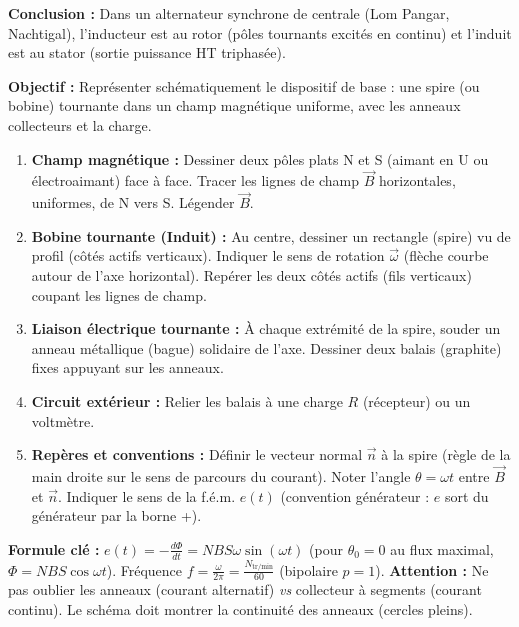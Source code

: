 \documentclass[11pt]{article}
\begin{document}
\begin{exoresolu}
\begin{enumerate}
\end{enumerate}
\par\medskip\noindent\textbf{Conclusion :} Dans un alternateur synchrone de centrale (Lom Pangar, Nachtigal), l'inducteur est au rotor (pôles tournants excités en continu) et l'induit est au stator (sortie puissance HT triphasée).
\end{exoresolu}

\begin{methode}
    \textbf{Objectif :} Représenter schématiquement le dispositif de base : une spire (ou bobine) tournante dans un champ magnétique uniforme, avec les anneaux collecteurs et la charge.
    \begin{enumerate}
        \item \textbf{Champ magnétique :} Dessiner deux pôles plats N et S (aimant en U ou électroaimant) face à face. Tracer les lignes de champ $\vec{B}$ horizontales, uniformes, de N vers S. Légender $\vec{B}$.
        \item \textbf{Bobine tournante (Induit) :} Au centre, dessiner un rectangle (spire) vu de profil (côtés actifs verticaux). Indiquer le sens de rotation $\vec{\omega}$ (flèche courbe autour de l'axe horizontal). Repérer les deux côtés actifs (fils verticaux) coupant les lignes de champ.
        \item \textbf{Liaison électrique tournante :} À chaque extrémité de la spire, souder un anneau métallique (bague) solidaire de l'axe. Dessiner deux balais (graphite) fixes appuyant sur les anneaux.
        \item \textbf{Circuit extérieur :} Relier les balais à une charge $R$ (récepteur) ou un voltmètre.
        \item \textbf{Repères et conventions :} Définir le vecteur normal $\vec{n}$ à la spire (règle de la main droite sur le sens de parcours du courant). Noter l'angle $\theta = \omega t$ entre $\vec{B}$ et $\vec{n}$. Indiquer le sens de la f.é.m. $e(t)$ (convention générateur : $e$ sort du générateur par la borne +).
    \end{enumerate}
    \textbf{Formule clé :} $e(t) = -\frac{d\Phi}{dt} = N B S \omega \sin(\omega t)$ (pour $\theta_0=0$ au flux maximal, $\Phi = NBS\cos\omega t$). Fréquence $f = \frac{\omega}{2\pi} = \frac{N_{\text{tr/min}}}{60}$ (bipolaire $p=1$).
    \textbf{Attention :} Ne pas oublier les anneaux (courant alternatif) \emph{vs} collecteur à segments (courant continu). Le schéma doit montrer la continuité des anneaux (cercles pleins).
\end{methode}
\end{document}

